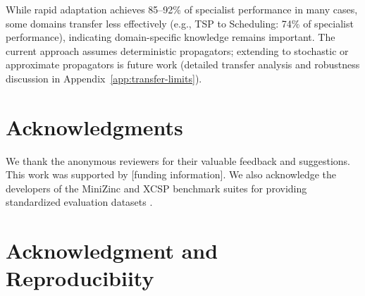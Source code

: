 \documentclass[11pt]{article}
\begin{document}
While rapid adaptation achieves 85--92\% of specialist performance in many cases, some domains transfer less effectively (e.g., TSP to Scheduling: 74\% of specialist performance), indicating domain-specific knowledge remains important. The current approach assumes deterministic propagators; extending to stochastic or approximate propagators is future work (detailed transfer analysis and robustness discussion in Appendix~\ref{app:transfer-limits}).





\section*{Acknowledgments}

We thank the anonymous reviewers for their valuable feedback and suggestions. This work was supported by [funding information]. We also acknowledge the developers of the MiniZinc and XCSP benchmark suites for providing standardized evaluation datasets \citep{van2011minizinc,lecoutre2011xcsp}.

%


\appendix


\section*{Acknowledgment and Reproducibiity}
\end{document}
